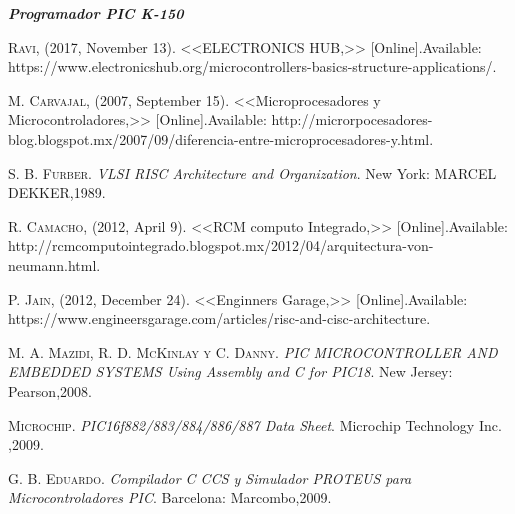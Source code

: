 \documentclass[12pt,a4paper]{article}
\begin{document}
   \textbf{\textit{Programador PIC K-150}}
   
   
   \newpage
   \begin{thebibliography}{10}
     \textsc{Ravi}, (2017, November 13). <<ELECTRONICS HUB,>> [Online].Available: https://www.electronicshub.org/microcontrollers-basics-structure-applications/.
     
     \textsc{M. Carvajal}, (2007, September 15). <<Microprocesadores y Microcontroladores,>> [Online].Available: http://microrpocesadores-blog.blogspot.mx/2007/09/diferencia-entre-microprocesadores-y.html.
     
     \textsc{S. B. Furber}. \textit{VLSI RISC Architecture and Organization}. New York: MARCEL DEKKER,1989.
     
     \textsc{R. Camacho}, (2012, April 9). <<RCM computo Integrado,>> [Online].Available: http://rcmcomputointegrado.blogspot.mx/2012/04/arquitectura-von-neumann.html.
     
     \textsc{P. Jain}, (2012, December 24). <<Enginners Garage,>> [Online].Available: https://www.engineersgarage.com/articles/risc-and-cisc-architecture.
     
      \textsc{M. A. Mazidi, R. D. McKinlay y C. Danny}. \textit{PIC MICROCONTROLLER AND EMBEDDED SYSTEMS Using Assembly and C for PIC18}. New Jersey: Pearson,2008.
      
      \textsc{Microchip}. \textit{PIC16f882/883/884/886/887 Data Sheet}. Microchip Technology Inc. ,2009.
      
      \textsc{G. B. Eduardo}. \textit{Compilador C CCS y Simulador PROTEUS para Microcontroladores PIC}. Barcelona: Marcombo,2009.
    \end{thebibliography}
\end{document}
